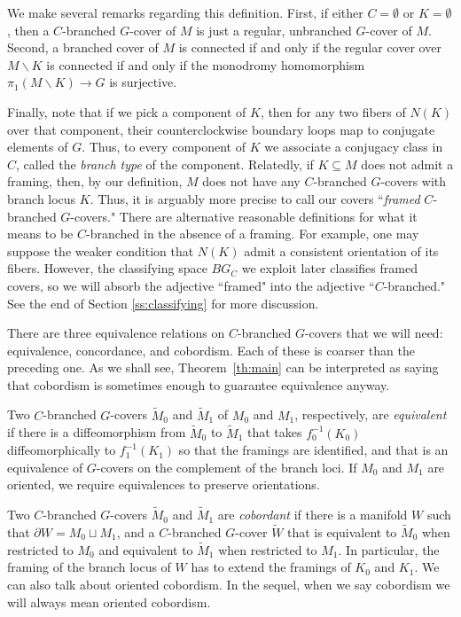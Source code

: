 \documentclass[10pt,twocolumn,amsmath,amssymb,aps,pra,secnumarabic,
    nofootinbib,groupedaddress]{revtex4-1}
\newcommand{\Thm}[1]{Theorem~\ref{#1}}
\renewcommand{\setminus}{\smallsetminus}
\begin{document}
We make several remarks regarding this definition.  First, if either $C = \emptyset$ or $K = \emptyset$, then a $C$-branched $G$-cover of $M$ is just a regular, unbranched $G$-cover of $M$.  Second, a branched cover of $M$ is connected if and only if the regular cover over $M\setminus K$ is connected if and only if the monodromy homomorphism $\pi_1(M \setminus K) \to G$ is surjective.

Finally, note that if we pick a component of $K$, then for any two fibers of $N(K)$ over that component, their counterclockwise boundary loops map to conjugate elements of $G$.  Thus, to every component of $K$ we associate a conjugacy class in $C$, called the \emph{branch type} of the component.  Relatedly, if $K \subseteq M$ does not admit a framing, then, by our definition, $M$ does not have any $C$-branched $G$-covers with branch locus $K$.  Thus, it is arguably more precise to call our covers ``\emph{framed} $C$-branched $G$-covers."  There are alternative reasonable definitions for what it means to be $C$-branched in the absence of a framing. For example, one may suppose the weaker condition that $N(K)$ admit a consistent orientation of its fibers.  However,
the classifying space $BG_C$ we exploit later classifies framed covers, so we will absorb the adjective ``framed" into the adjective ``$C$-branched."  See the end of Section \ref{ss:classifying} for more discussion.

There are three equivalence relations on $C$-branched $G$-covers that we will need: equivalence, concordance, and cobordism.  Each of these is coarser than the preceding one.  As we shall see, \Thm{th:main} can be interpreted as saying that cobordism is sometimes enough to guarantee equivalence anyway.

Two $C$-branched $G$-covers $\tilde{M}_0$ and $\tilde{M}_1$ of $M_0$ and $M_1$, respectively, are \emph{equivalent} if there is a diffeomorphism from $\tilde{M}_0$ to $\tilde{M}_1$ that takes $f_0^{-1}(K_0)$ diffeomorphically to $f_1^{-1}(K_1)$ so that the framings are identified, and that is an equivalence of $G$-covers on the complement of the branch loci.  If $M_0$ and $M_1$ are oriented, we require equivalences to preserve orientations.

Two $C$-branched $G$-covers $\tilde{M}_0$ and $\tilde{M}_1$ are \emph{cobordant} if there is a manifold $W$ such that $\partial W = M_0 \sqcup M_1$, and a $C$-branched $G$-cover $\tilde{W}$ that is equivalent to $\tilde{M}_0$ when restricted to $M_0$ and equivalent to $\tilde{M}_1$ when restricted to $M_1$.  In particular, the framing of the branch locus of $W$ has to extend the framings of $K_0$ and $K_1$.  We can also talk about oriented cobordism.  In the sequel, when we say cobordism we will always mean oriented cobordism.
\end{document}
